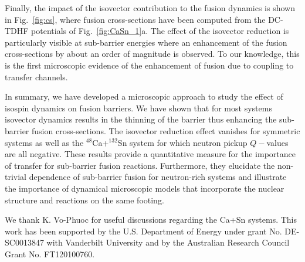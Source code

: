 \documentclass[aps,prl,twocolumn,superscriptaddress,floatfix,10pt]{revtex4-1}
\begin{document}
Finally, the impact of the isovector contribution to the fusion dynamics is shown in Fig.~\ref{fig:cs},
where fusion cross-sections have been computed from the DC-TDHF potentials of Fig.~\ref{fig:CaSn_1}a.
The effect of the isovector reduction is particularly visible at sub-barrier energies where an enhancement
of the fusion cross-sections by about an order of magnitude is observed.
To our knowledge, this is the first microscopic evidence of the enhancement
of fusion due to coupling to transfer channels.

In summary, we have developed a microscopic approach to study the effect of isospin dynamics on fusion barriers.
We have shown that for most systems isovector dynamics results in the thinning of the barrier thus enhancing
the sub-barrier fusion cross-sections. The isovector reduction effect vanishes for symmetric systems as well
as the $^{48}$Ca+$^{132}$Sn system for which neutron pickup $Q-$values are all negative.
These results provide a quantitative measure for the importance of transfer for
sub-barrier fusion reactions.
Furthermore, they elucidate the non-trivial dependence of sub-barrier fusion for neutron-rich
systems and illustrate the importance of dynamical microscopic models that incorporate the nuclear
structure and reactions on the same footing.

We thank K. Vo-Phuoc for useful discussions regarding the Ca+Sn systems.
This work has been supported by the U.S. Department of Energy under grant No.
DE-SC0013847 with Vanderbilt University and by the
Australian Research Council Grant No. FT120100760. 

\end{document}
